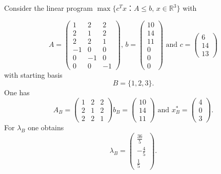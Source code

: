 \begin{example}
  \label{example:moving}
  Consider the linear program $\max\{ c^Tx ： A≤b, \,x∈ℝ^3 \}$ with
  
  \begin{displaymath}
    A  =\begin{pmatrix}1 & 2 & 2\\2 & 1 & 2\\2 & 2 & 1\\-1 & 0 & 0\\0 & -1 & 0\\0 & 0 & -1\end{pmatrix}, \, b = 
    \begin{pmatrix}10\\14\\11\\0\\0\\0\end{pmatrix} \text{ and } c =
    \begin{pmatrix}
      6\\14\\13
    \end{pmatrix}
  \end{displaymath}
  with starting basis
  \begin{displaymath}
    B = \{1,2,3\}. 
  \end{displaymath}
  One has
  \begin{displaymath}
    A_B = \begin{pmatrix}1 & 2 & 2\\2 & 1 & 2\\2 & 2 & 1\end{pmatrix} b_B = \begin{pmatrix}10\\14\\11\end{pmatrix} \text{ and } x^*_B = \begin{pmatrix}4\\0\\3\end{pmatrix}. 
  \end{displaymath}
  For $λ_B$ one obtains
  \begin{displaymath}
    λ_B = \begin{pmatrix}\frac{36}{5}\\- \frac{4}{5}\\\frac{1}{5}\end{pmatrix}. 
  \end{displaymath}

\end{example}
